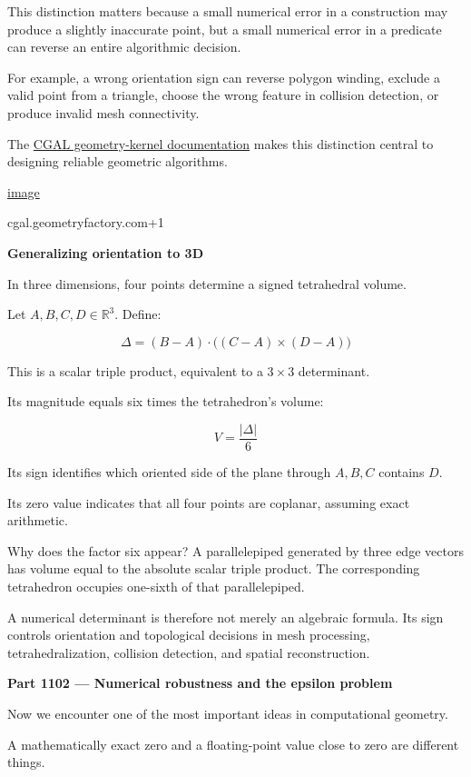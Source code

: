 This distinction matters because a small numerical error in a construction may produce a slightly inaccurate point, but a small numerical error in a predicate can reverse an entire algorithmic decision.

For example, a wrong orientation sign can reverse polygon winding, exclude a valid point from a triangle, choose the wrong feature in collision detection, or produce invalid mesh connectivity.

The \href{https://cgal.geometryfactory.com/CGAL/doc/main/Kernel_23/index.html?utm_source=chatgpt.com}{CGAL geometry-kernel documentation} makes this distinction central to designing reliable geometric algorithms. 

\href{https://www.google.com/s2/favicons?domain=https://cgal.geometryfactory.com&sz=32}{image}

cgal.geometryfactory.com+1

\textbf{Generalizing orientation to 3D}

In three dimensions, four points determine a signed tetrahedral volume.

Let \(A,B,C,D\in\mathbb{R}^3\). Define:

\[
\Delta = (B-A)\cdot\big((C-A)\times(D-A)\big)
\]

This is a scalar triple product, equivalent to a \(3\times3\) determinant.

Its magnitude equals six times the tetrahedron's volume:

\[
V=\frac{|\Delta|}{6}
\]

Its sign identifies which oriented side of the plane through \(A,B,C\) contains \(D\).

Its zero value indicates that all four points are coplanar, assuming exact arithmetic.

Why does the factor six appear? A parallelepiped generated by three edge vectors has volume equal to the absolute scalar triple product. The corresponding tetrahedron occupies one-sixth of that parallelepiped.

A numerical determinant is therefore not merely an algebraic formula. Its sign controls orientation and topological decisions in mesh processing, tetrahedralization, collision detection, and spatial reconstruction.

\textbf{Part 1102 --- Numerical robustness and the epsilon problem}

Now we encounter one of the most important ideas in computational geometry.

A mathematically exact zero and a floating-point value close to zero are different things.

